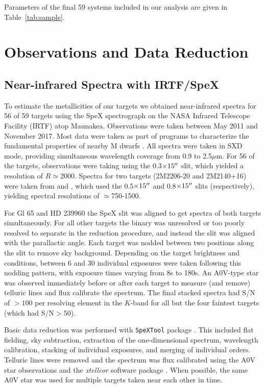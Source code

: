 \documentclass[twocolumn]{aastex62}
\begin{document}
Parameters of the final 59 systems included in our analysis are given in Table~\ref{tab:sample}.

\section{Observations and Data Reduction}\label{sec:obs} 

\subsection{Near-infrared Spectra with IRTF/SpeX}

To estimate the metallicities of our targets we obtained near-infrared spectra for 56 of 59 targets using the SpeX spectrograph \citep{Rayner2003} on the NASA Infrared Telescope Facility (IRTF) atop Maunakea. Observations were taken between May 2011 and November 2017. Most data were taken as part of programs to characterize the fundamental properties of nearby M dwarfs \citep[e.g.,][]{Mann2013c,Gaidos2014,Terrien2015}. All spectra were taken in SXD mode, providing simultaneous wavelength coverage from 0.9 to 2.5$\mu$m. For 56 of the targets, observations were taking using the 0.3$\times15\mbox{$^{\prime\prime}$}$ slit, which yielded a resolution of $R\simeq2000$. Spectra for two targets (2M2206-20 and 2M2140+16) were taken from \citet{2009ApJ...706..328D} and \citet{Dupuy2012}, which used the 0.5$\times15\mbox{$^{\prime\prime}$}$ and 0.8$\times15\mbox{$^{\prime\prime}$}$ slits (respectively), yielding spectral resolutions of $\simeq$750-1500. 

For Gl 65 and HD 239960 the SpeX slit was aligned to get spectra of both targets simultaneously. For all other targets the binary was unresolved or too poorly resolved to separate in the reduction procedure, and instead the slit was aligned with the parallactic angle. Each target was nodded between two positions along the slit to remove  sky background. Depending on the target brightness and conditions, between 6 and 30 individual exposures were taken following this nodding pattern, with exposure times varying from 8s to 180s. An A0V-type star was observed immediately before or after each target to measure (and remove) telluric lines and flux calibrate the spectrum. The final stacked spectra had S/N of $>100$ per resolving element in the $K$-band for all but the four faintest targets (which had S/N$>50$). 

Basic data reduction was performed with {\tt SpeXTool} package \citep{Cushing2004}. This included flat fielding, sky subtraction, extraction of the one-dimensional spectrum, wavelength calibration, stacking of individual exposures, and merging of individual orders. Telluric lines were removed and the spectrum was flux calibrated using the A0V star observations and the \textit{xtellcor} software package \citep{Vacca2003}. When possible, the same A0V star was used for multiple targets taken near each other in time. 
\end{document}
